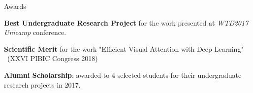 \documentclass[8pt]{resume}
\newcommand{\tit}[1]{\textit{#1}}
\newcommand{\tbf}[1]{\textbf{#1}}
\newcommand{\ttt}[1]{\texttt{#1}}
\begin{document}
\begin{rSection}{Awards}
\begin{rSubsection}{}{}{}{}
    \vspace{-0.5em}
    \item \tbf{Best Undergraduate Research Project} for the work presented at \tit{WTD2017 Unicamp} conference.
    \item \tbf{Scientific Merit} for the work "Efficient Visual Attention with Deep Learning" ~(XXVI PIBIC Congress 2018)
    \item \tbf{Alumni Scholarship}: awarded to 4 selected students for their undergraduate research projects in 2017.
\end{rSubsection}
\end{rSection}


\end{document}
